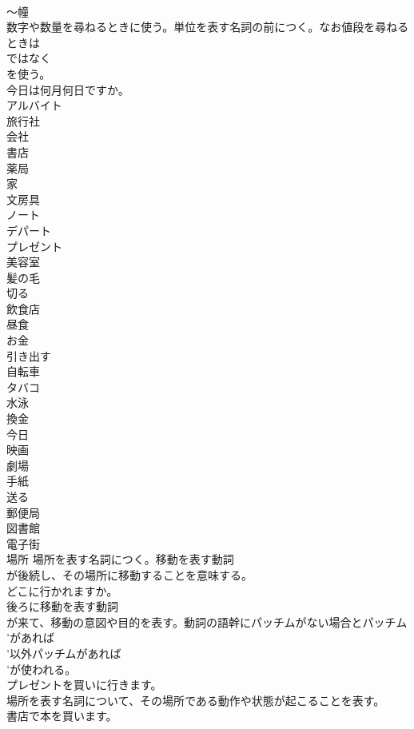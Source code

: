 \documentclass[8pt]{extreport}
\begin{document}
\begin{CJK}{UTF8}{min}
\\	～幢
\\	数字や数量を尋ねるときに使う。単位を表す名詞の前につく。なお値段を尋ねるときは
\\	ではなく 
\\	を使う。	
\\	今日は何月何日ですか。
\\	アルバイト
\\	旅行社
\\	会社
\\	書店
\\	薬局
\\	家
\\	文房具
\\	ノート
\\	デパート
\\	プレゼント
\\	美容室
\\	髪の毛
\\	切る
\\	飲食店
\\	昼食
\\	お金
\\	引き出す
\\	自転車
\\	タバコ
\\	水泳
\\	換金
\\	今日
\\	映画
\\	劇場
\\	手紙
\\	送る
\\	郵便局
\\	図書館
\\	電子街
\\	場所	場所を表す名詞につく。移動を表す動詞
\\	が後続し、その場所に移動することを意味する。	
\\	どこに行かれますか。
\\	後ろに移動を表す動詞
\\	が来て、移動の意図や目的を表す。動詞の語幹にパッチムがない場合とパッチム
\\	'があれば 
\\	'以外パッチムがあれば
\\	'が使われる。	
\\	プレゼントを買いに行きます。
\\	場所を表す名詞について、その場所である動作や状態が起こることを表す。	
\\	書店で本を買います。

\end{CJK}
\end{document}
